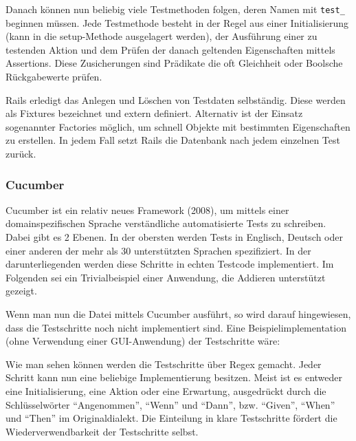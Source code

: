 Danach können nun beliebig viele Testmethoden folgen, deren Namen mit \texttt{test\_} beginnen müssen.
Jede Testmethode besteht in der Regel aus einer Initialisierung (kann in die setup-Methode ausgelagert werden), der Ausführung einer zu testenden Aktion und dem Prüfen der danach geltenden Eigenschaften mittels Assertions. Diese Zusicherungen sind Prädikate die oft Gleichheit oder Boolsche Rückgabewerte prüfen.


Rails erledigt das Anlegen und Löschen von Testdaten selbständig. Diese werden als Fixtures bezeichnet und extern definiert. Alternativ ist der Einsatz sogenannter Factories möglich, um schnell Objekte mit bestimmten Eigenschaften zu erstellen. In jedem Fall setzt Rails die Datenbank nach jedem einzelnen Test zurück.


\subsubsection{Cucumber}

Cucumber ist ein relativ neues Framework (2008), um mittels einer domainspezifischen Sprache verständliche automatisierte Tests zu schreiben. Dabei gibt es 2 Ebenen. In der obersten werden Tests in Englisch, Deutsch oder einer anderen der mehr als 30 unterstützten Sprachen spezifiziert. In der darunterliegenden werden diese Schritte in echten Testcode implementiert. Im Folgenden sei ein Trivialbeispiel einer Anwendung, die Addieren unterstützt gezeigt.



Wenn man nun die Datei mittels Cucumber ausführt, so wird darauf hingewiesen, dass die Testschritte noch nicht implementiert sind.
Eine Beispielimplementation (ohne Verwendung einer GUI-Anwendung) der Testschritte wäre:



Wie man sehen können werden die Testschritte über Regex gemacht. Jeder Schritt kann nun eine beliebige Implementierung besitzen. Meist ist es entweder eine Initialisierung, eine Aktion oder eine Erwartung, ausgedrückt durch die Schlüsselwörter "`Angenommen"', "`Wenn"' und "`Dann"', bzw. "`Given"', "`When"' und "`Then"' im Originaldialekt. Die Einteilung in klare Testschritte fördert die Wiederverwendbarkeit der Testschritte selbst.

